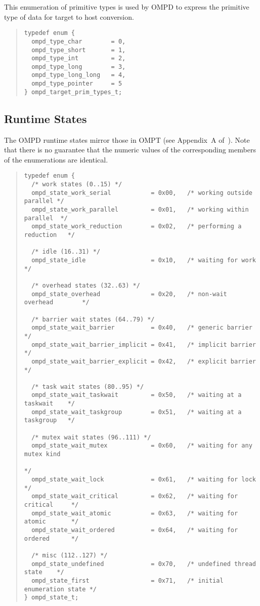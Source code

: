 This enumeration of primitive types is used by OMPD to express the primitive
type of data for target to host conversion.

\begin{quote}
\begin{lstlisting}
typedef enum {
  ompd_type_char        = 0,
  ompd_type_short       = 1,
  ompd_type_int         = 2,
  ompd_type_long        = 3,
  ompd_type_long_long   = 4,
  ompd_type_pointer     = 5
} ompd_target_prim_types_t;
\end{lstlisting}
\end{quote}

\subsection{Runtime States}

The OMPD runtime states mirror those in OMPT (see Appendix~A
of~\cite{ompt-tr2}).
Note that there is no guarantee that the numeric values of the
corresponding members of the enumerations are identical.

\begin{quote}
\begin{lstlisting}
typedef enum {
  /* work states (0..15) */
  ompd_state_work_serial           = 0x00,   /* working outside parallel */
  ompd_state_work_parallel         = 0x01,   /* working within parallel  */
  ompd_state_work_reduction        = 0x02,   /* performing a reduction   */

  /* idle (16..31) */
  ompd_state_idle                  = 0x10,   /* waiting for work         */

  /* overhead states (32..63) */
  ompd_state_overhead              = 0x20,   /* non-wait overhead        */

  /* barrier wait states (64..79) */
  ompd_state_wait_barrier          = 0x40,   /* generic barrier          */
  ompd_state_wait_barrier_implicit = 0x41,   /* implicit barrier         */
  ompd_state_wait_barrier_explicit = 0x42,   /* explicit barrier         */

  /* task wait states (80..95) */
  ompd_state_wait_taskwait         = 0x50,   /* waiting at a taskwait    */
  ompd_state_wait_taskgroup        = 0x51,   /* waiting at a taskgroup   */

  /* mutex wait states (96..111) */
  ompd_state_wait_mutex            = 0x60,   /* waiting for any mutex kind
                                                                         */
  ompd_state_wait_lock             = 0x61,   /* waiting for lock         */  
  ompd_state_wait_critical         = 0x62,   /* waiting for critical     */
  ompd_state_wait_atomic           = 0x63,   /* waiting for atomic       */
  ompd_state_wait_ordered          = 0x64,   /* waiting for ordered      */

  /* misc (112..127) */
  ompd_state_undefined             = 0x70,   /* undefined thread state    */
  ompd_state_first                 = 0x71,   /* initial enumeration state */
} ompd_state_t;
\end{lstlisting}
\end{quote}

